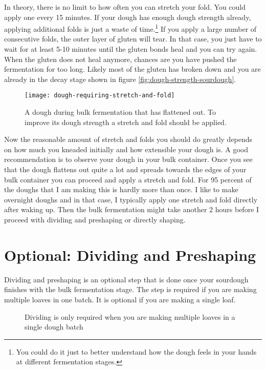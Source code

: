 In theory, there is no limit to how often you can stretch your fold. You could
apply one every 15 minutes. If your dough has enough dough strength already,
applying additional folds is just a waste of time.\footnote{You could do it just to better understand how the
dough feels in your hands at different fermentation stages.} If you apply a
large number of consecutive folds, the outer layer of gluten
will tear. In that case, you just have to wait for at least 5-10 minutes until
the gluten bonds heal and you can try again. When the gluten does not heal
anymore, chances are you have pushed the fermentation for too long. Likely
most of the gluten has broken down and you are already
in the decay stage shown in figure \ref{fig:dough-strength-sourdough}.

\begin{figure}[!htb]
  \texttt{[image: dough-requiring-stretch-and-fold]}
  \caption{A dough during bulk fermentation that has flattened out. To improve
  its dough strength a stretch and fold should be applied.}
\end{figure}

Now the reasonable amount of stretch and folds you should do greatly depends on how much you
kneaded initially and how extensible your dough is. A good recommendation is
to observe your dough in your bulk container. Once you see that the dough
flattens out quite a lot and spreads towards the edges of your bulk container
you can proceed and apply a stretch and fold. For 95 percent of the doughs
that I am making this is hardly more than once. I like to make overnight
doughs and in that case, I typically apply one stretch and fold directly after
waking up. Then the bulk fermentation might take another 2 hours before I
proceed with dividing and preshaping or directly shaping.

\section{Optional: Dividing and Preshaping}

Dividing and preshaping is an optional step that is done
once your sourdough finishes with the bulk fermentation stage.
The step is required if you are making multiple loaves in one
batch. It is optional if you are making a single loaf.

\begin{figure}[!htb]
  \caption{Dividing is only required when you are making multiple loaves in a single dough batch}
  \label{fig:dividing-decision-tree}
\end{figure}

